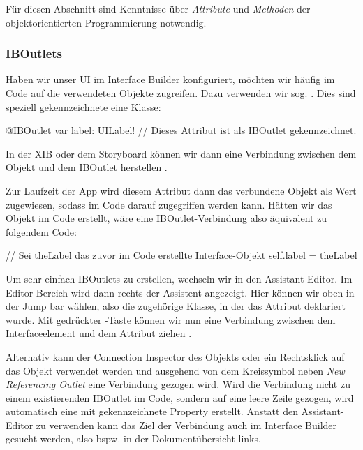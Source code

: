 \documentclass[parskip=half, final]{scrreprt}
\begin{document}
 Für diesen Abschnitt sind Kenntnisse über \emph{Attribute} und \emph{Methoden} der objektorientierten Programmierung notwendig.

\subsubsection{IBOutlets}

Haben wir unser UI im Interface Builder konfiguriert, möchten wir häufig im Code auf die verwendeten Objekte zugreifen. Dazu verwenden wir sog. . Dies sind speziell gekennzeichnete  eine Klasse:
\begin{swiftcode}
@IBOutlet var label: UILabel! // Dieses Attribut ist als IBOutlet gekennzeichnet.
\end{swiftcode}

In der XIB oder dem Storyboard können wir dann eine Verbindung zwischen dem Objekt und dem IBOutlet herstellen .


Zur Laufzeit der App wird diesem Attribut dann das verbundene Objekt als Wert zugewiesen, sodass im Code darauf zugegriffen werden kann. Hätten wir das Objekt im Code erstellt, wäre eine IBOutlet-Verbindung also äquivalent zu folgendem Code:
\begin{swiftcode}
// Sei theLabel das zuvor im Code erstellte Interface-Objekt
self.label = theLabel
\end{swiftcode}

Um sehr einfach IBOutlets zu erstellen, wechseln wir in den Assistant-Editor. Im Editor Bereich wird dann rechts der Assistent angezeigt. Hier können wir oben in der Jump bar  wählen, also die zugehörige Klasse, in der das Attribut deklariert wurde. Mit gedrückter \keys{\ctrl}-Taste können wir nun eine Verbindung zwischen dem Interfaceelement und dem Attribut ziehen .

Alternativ kann der Connection Inspector des Objekts  oder ein Rechtsklick auf das Objekt verwendet werden und ausgehend von dem Kreissymbol neben \emph{New Referencing Outlet} eine Verbindung gezogen wird. Wird die Verbindung nicht zu einem existierenden IBOutlet im Code, sondern auf eine leere Zeile gezogen, wird automatisch eine mit  gekennzeichnete Property erstellt. Anstatt den Assistant-Editor zu verwenden kann das Ziel der Verbindung auch im Interface Builder gesucht werden, also bspw. in der Dokumentübersicht links.
\end{document}
